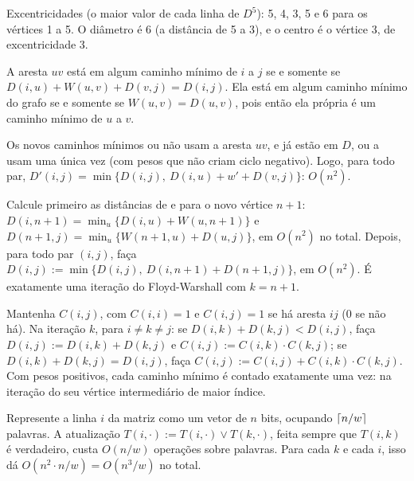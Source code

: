  Excentricidades (o maior valor de cada linha de $D^5$): 5, 4, 3, 5 e 6 para os vértices 1 a 5. O diâmetro é 6 (a distância de 5 a 3), e o centro é o vértice 3, de excentricidade 3.

 A aresta $uv$ está em algum caminho mínimo de $i$ a $j$ se e somente se $D(i,u)+W(u,v)+D(v,j)=D(i,j)$. Ela está em algum caminho mínimo do grafo se e somente se $W(u,v)=D(u,v)$, pois então ela própria é um caminho mínimo de $u$ a $v$.

 Os novos caminhos mínimos ou não usam a aresta $uv$, e já estão em $D$, ou a usam uma única vez (com pesos que não criam ciclo negativo). Logo, para todo par, $D'(i,j)=\min\{D(i,j),\ D(i,u)+w'+D(v,j)\}$: $O(n^2)$.

 Calcule primeiro as distâncias de e para o novo vértice $n+1$: $D(i,n+1)=\min_u\{D(i,u)+W(u,n+1)\}$ e $D(n+1,j)=\min_u\{W(n+1,u)+D(u,j)\}$, em $O(n^2)$ no total. Depois, para todo par $(i,j)$, faça $D(i,j):=\min\{D(i,j),\ D(i,n+1)+D(n+1,j)\}$, em $O(n^2)$. É exatamente uma iteração do Floyd-Warshall com $k=n+1$.

 Mantenha $C(i,j)$, com $C(i,i)=1$ e $C(i,j)=1$ se há aresta $ij$ (0 se não há). Na iteração $k$, para $i\ne k\ne j$: se $D(i,k)+D(k,j)<D(i,j)$, faça $D(i,j):=D(i,k)+D(k,j)$ e $C(i,j):=C(i,k)\cdot C(k,j)$; se $D(i,k)+D(k,j)=D(i,j)$, faça $C(i,j):=C(i,j)+C(i,k)\cdot C(k,j)$. Com pesos positivos, cada caminho mínimo é contado exatamente uma vez: na iteração do seu vértice intermediário de maior índice.

 Represente a linha $i$ da matriz como um vetor de $n$ bits, ocupando $\lceil n/w\rceil$ palavras. A atualização $T(i,\cdot):=T(i,\cdot)\lor T(k,\cdot)$, feita sempre que $T(i,k)$ é verdadeiro, custa $O(n/w)$ operações sobre palavras. Para cada $k$ e cada $i$, isso dá $O(n^2\cdot n/w)=O(n^3/w)$ no total.
